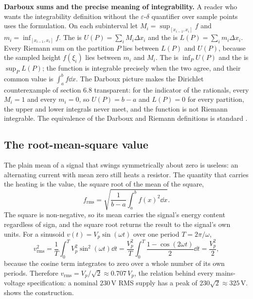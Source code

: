 \begin{mastery}
\textbf{Darboux sums and the precise meaning of integrability.}
A reader who wants the integrability definition without the
$\varepsilon$-$\delta$ quantifier over sample points uses the
 formulation. On each subinterval let $M_{i} =
\sup_{[x_{i-1}, x_{i}]} f$ and $m_{i} = \inf_{[x_{i-1}, x_{i}]} f$.
The  is $U(P) = \sum_{i} M_{i}\Delta
x_{i}$ and the  is $L(P) = \sum_{i}
m_{i}\Delta x_{i}$. Every Riemann sum on the partition $P$ lies
between $L(P)$ and $U(P)$, because the sampled height $f(\xi_{i})$
lies between $m_{i}$ and $M_{i}$. The  is
$\inf_{P} U(P)$ and the  is $\sup_{P}
L(P)$; the function is integrable precisely when the two agree, and
their common value is $\int_{a}^{b} f \dd x$. The Darboux picture
makes the Dirichlet counterexample of section 6.8 transparent: for
the indicator of the rationals, every $M_{i} = 1$ and every
$m_{i} = 0$, so $U(P) = b - a$ and $L(P) = 0$ for every partition,
the upper and lower integrals never meet, and the function is not
Riemann integrable. The equivalence of the Darboux and Riemann
definitions is standard \cite{text:v2ch06-apostol-calculus}.
\end{mastery}

\subsection{The root-mean-square value}

The plain mean of a signal that swings symmetrically about zero is
useless: an alternating current with mean zero still heats a
resistor. The quantity that carries the heating is the
 value, the square root of the mean of the
square,
\[
f_{\mathrm{rms}} = \sqrt{\frac{1}{b-a}\int_{a}^{b} f(x)^{2}\dd x}.
\]
The square is non-negative, so its mean carries the signal's energy
content regardless of sign, and the square root returns the result
to the signal's own units. For a sinusoid $v(t) = V_{p}\sin(\omega
t)$ over one period $T = 2\pi/\omega$,
\[
v_{\mathrm{rms}}^{2} = \frac{1}{T}\int_{0}^{T} V_{p}^{2}\sin^{2}
(\omega t)\dd t = \frac{V_{p}^{2}}{T}\int_{0}^{T}
\frac{1 - \cos(2\omega t)}{2}\dd t = \frac{V_{p}^{2}}{2},
\]
because the cosine term integrates to zero over a whole number of
its own periods. Therefore $v_{\mathrm{rms}} = V_{p}/\sqrt{2}
\approx 0.707\,V_{p}$, the relation behind every mains-voltage
specification: a nominal $230\,\text{V}$ RMS supply has a peak of
$230\sqrt{2} \approx 325\,\text{V}$.
 shows the construction.

